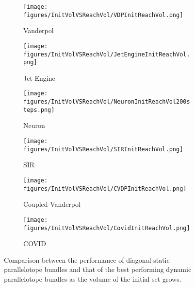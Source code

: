 \begin{figure}[h!]
    \hspace{-1.5em}
    \begin{subfigure}{0.5\textwidth}
    \centering
    \texttt{[image: figures/InitVolVSReachVol/VDPInitReachVol.png]}
    \caption{Vanderpol}
    \end{subfigure}%
    \begin{subfigure}{0.5\textwidth}
    \centering
    \texttt{[image: figures/InitVolVSReachVol/JetEngineInitReachVol.png]}
    \caption{Jet Engine}
    \end{subfigure}

    \hspace{-1.5em}
    \begin{subfigure}{0.5\textwidth}
    \centering
    \texttt{[image: figures/InitVolVSReachVol/NeuronInitReachVol200steps.png]}
    \caption{Neuron}
    \end{subfigure}%
    \begin{subfigure}{0.5\textwidth}
    \centering
    \texttt{[image: figures/InitVolVSReachVol/SIRInitReachVol.png]}
    \caption{SIR}
    \end{subfigure}

    \hspace{-1.5em}
    \begin{subfigure}{0.5\textwidth}
    \centering
    \texttt{[image: figures/InitVolVSReachVol/CVDPInitReachVol.png]}
    \caption{Coupled Vanderpol}
    \end{subfigure}%
    \begin{subfigure}{0.5\textwidth}
    \centering
    \texttt{[image: figures/InitVolVSReachVol/CovidInitReachVol.png]}
    \caption{COVID}
    \end{subfigure}

    \caption{Comparison between the performance of diagonal static parallelotope bundles and that of the best performing dynamic parallelotope bundles as the volume of the initial set grows.}
    \label{fig:InitVolReachComp}
\end{figure}
\clearpage

